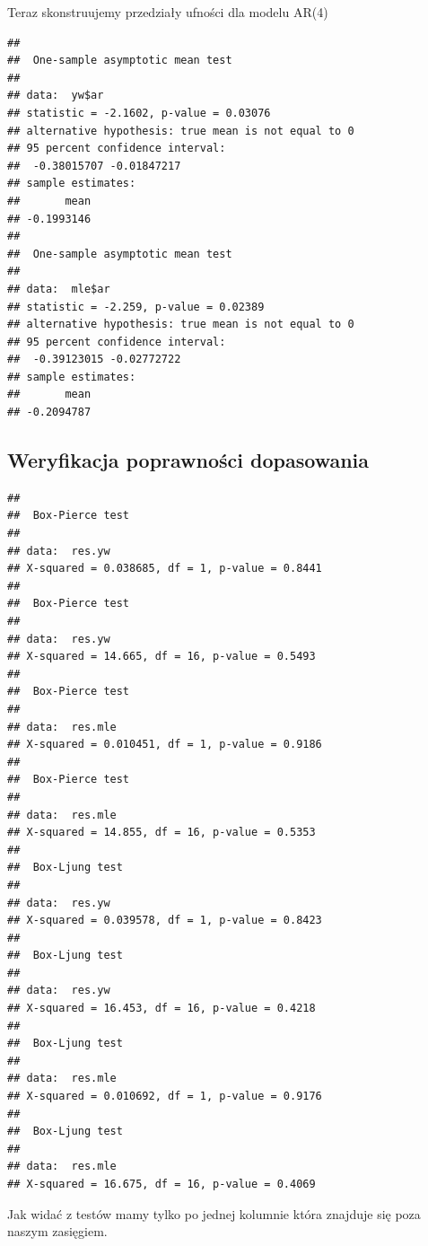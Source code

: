 \documentclass[12pt, a4paper]{article}\usepackage[]{graphicx}\usepackage[]{color}
\makeatletter
\newenvironment{kframe}{%
 \def\at@end@of@kframe{}%
 \ifinner\ifhmode%
  \def\at@end@of@kframe{\end{minipage}}%
  \begin{minipage}{\columnwidth}%
 \fi\fi%
 \def\FrameCommand##1{\hskip\@totalleftmargin \hskip-\fboxsep
 \colorbox{shadecolor}{##1}\hskip-\fboxsep
     \hskip-\linewidth \hskip-\@totalleftmargin \hskip\columnwidth}%
 \MakeFramed {\advance\hsize-\width
   \@totalleftmargin\z@ \linewidth\hsize
   \@setminipage}}%
 {\par\unskip\endMakeFramed%
 \at@end@of@kframe}
\newenvironment{knitrout}{}{} %
\makeatother
\begin{document}
Teraz skonstruujemy przedziały ufności dla modelu AR(4) %


\begin{knitrout}
\color{fgcolor}\begin{kframe}
\begin{verbatim}
## 
## 	One-sample asymptotic mean test
## 
## data:  yw$ar
## statistic = -2.1602, p-value = 0.03076
## alternative hypothesis: true mean is not equal to 0
## 95 percent confidence interval:
##  -0.38015707 -0.01847217
## sample estimates:
##       mean 
## -0.1993146
## 
## 	One-sample asymptotic mean test
## 
## data:  mle$ar
## statistic = -2.259, p-value = 0.02389
## alternative hypothesis: true mean is not equal to 0
## 95 percent confidence interval:
##  -0.39123015 -0.02772722
## sample estimates:
##       mean 
## -0.2094787
\end{verbatim}
\end{kframe}
\end{knitrout}

\subsection{Weryfikacja poprawności dopasowania}

\begin{knitrout}
\color{fgcolor}\begin{kframe}
\begin{verbatim}
## 
## 	Box-Pierce test
## 
## data:  res.yw
## X-squared = 0.038685, df = 1, p-value = 0.8441
## 
## 	Box-Pierce test
## 
## data:  res.yw
## X-squared = 14.665, df = 16, p-value = 0.5493
## 
## 	Box-Pierce test
## 
## data:  res.mle
## X-squared = 0.010451, df = 1, p-value = 0.9186
## 
## 	Box-Pierce test
## 
## data:  res.mle
## X-squared = 14.855, df = 16, p-value = 0.5353
## 
## 	Box-Ljung test
## 
## data:  res.yw
## X-squared = 0.039578, df = 1, p-value = 0.8423
## 
## 	Box-Ljung test
## 
## data:  res.yw
## X-squared = 16.453, df = 16, p-value = 0.4218
## 
## 	Box-Ljung test
## 
## data:  res.mle
## X-squared = 0.010692, df = 1, p-value = 0.9176
## 
## 	Box-Ljung test
## 
## data:  res.mle
## X-squared = 16.675, df = 16, p-value = 0.4069
\end{verbatim}
\end{kframe}
\end{knitrout}

Jak widać z testów mamy tylko po jednej kolumnie która znajduje się poza naszym zasięgiem.
\end{document}
